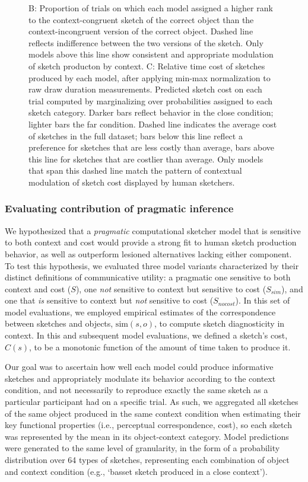 \documentclass[9pt,twocolumn,twoside]{pnas-new}
\begin{document}
\begin{figure}[htbp]
{B: Proportion of trials on which each model assigned a higher rank to the context-congruent sketch of the correct object than the context-incongruent version of the correct object. 
Dashed line reflects indifference between the two versions of the sketch. 
Only models above this line show consistent and appropriate modulation of sketch producton by context. C: Relative time cost of sketches produced by each model, after applying min-max normalization to raw draw duration measurements. 
Predicted sketch cost on each trial computed by marginalizing over probabilities assigned to each sketch category. 
Darker bars reflect behavior in the close condition; lighter bars the far condition. 
Dashed line indicates the average cost of sketches in the full dataset; bars below this line reflect a preference for sketches that are less costly than average, bars above this line for sketches that are costlier than average. 
Only models that span this dashed line match the pattern of contextual modulation of sketch cost displayed by human sketchers.}
\label{model_results}
\end{figure}

\subsubsection*{Evaluating contribution of pragmatic inference}

We hypothesized that a \textit{pragmatic} computational sketcher model that is sensitive to both context and cost would provide a strong fit to human sketch production behavior, as well as outperform lesioned alternatives lacking either component.
To test this hypothesis, we evaluated three model variants characterized by their distinct definitions of communicative utility: a pragmatic one sensitive to both context and cost ($S$), one \textit{not} sensitive to context but sensitive to cost ($S_{sim}$), and one that \textit{is} sensitive to context but \textit{not} sensitive to cost ($S_{nocost}$).
In this set of model evaluations, we employed empirical estimates of the correspondence between sketches and objects, $\textrm{sim}(s,o)$, to compute sketch diagnosticity in context. 
In this and subsequent model evaluations, we defined a sketch's cost, $C(s)$, to be a monotonic function of the amount of time taken to produce it.

Our goal was to ascertain how well each model could produce informative sketches and appropriately modulate its behavior according to the context condition, and not necessarily to reproduce exactly the same sketch as a particular participant had on a specific trial. 
As such, we aggregated all sketches of the same object produced in the same context condition when estimating their key functional properties (i.e., perceptual correspondence, cost), so each sketch was represented by the mean in its object-context category. 
Model predictions were generated to the same level of granularity, in the form of a probability distribution over 64 types of sketches, representing each combination of object and context condition (e.g., `basset sketch produced in a close context'). 
\end{document}
